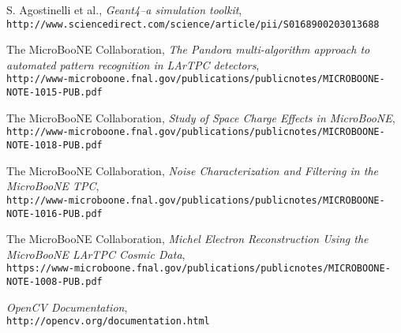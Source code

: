 \documentclass[12pt]{article}
\begin{document}
\begin{thebibliography}{20}
  S. Agostinelli et al., \emph{Geant4--a simulation toolkit},\\
  \texttt{http://www.sciencedirect.com/science/article/pii/S0168900203013688}

  The MicroBooNE Collaboration, \emph{The Pandora multi-algorithm approach to automated pattern recognition in LArTPC detectors},\\
  \texttt{http://www-microboone.fnal.gov/publications/publicnotes/MICROBOONE-NOTE-1015-PUB.pdf}

  The MicroBooNE Collaboration, \emph{Study of Space Charge Effects in MicroBooNE},\\
  \texttt{http://www-microboone.fnal.gov/publications/publicnotes/MICROBOONE-NOTE-1018-PUB.pdf}

  The MicroBooNE Collaboration, \emph{Noise Characterization and Filtering in the MicroBooNE TPC},\\
  \texttt{http://www-microboone.fnal.gov/publications/publicnotes/MICROBOONE-NOTE-1016-PUB.pdf}

  The MicroBooNE Collaboration, \emph{Michel Electron Reconstruction Using the MicroBooNE LArTPC Cosmic Data},\\
  \texttt{https://www-microboone.fnal.gov/publications/publicnotes/MICROBOONE-NOTE-1008-PUB.pdf}

  \emph{OpenCV Documentation},\\
  \texttt{http://opencv.org/documentation.html}


\end{thebibliography}
\end{document}
